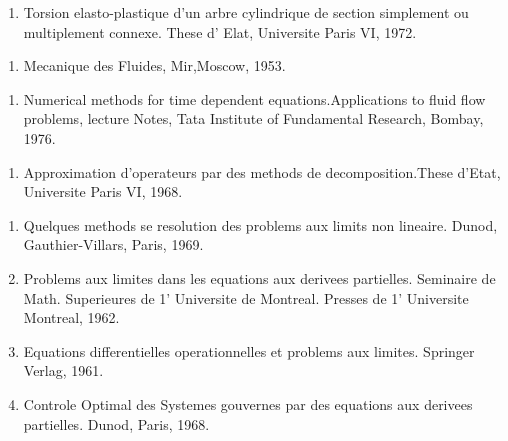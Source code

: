 \begin{thebibliography}{99}
  \begin{enumerate}
  \item Torsion elasto-plastique d'un arbre cylindrique de section
 simplement ou multiplement connexe. These d' Elat, Universite
 Paris VI, 1972.\label{k63:e1} 
  \end{enumerate}

  
  \begin{enumerate}
  \item  Mecanique des Fluides, Mir,Moscow, 1953.\label{k64:e1}
  \end{enumerate}
  
  
  \begin{enumerate}
  \item  Numerical methods for time dependent equations.Applications
 to fluid flow problems, lecture Notes, Tata Institute of
 Fundamental Research, Bombay, 1976.\label{k65:e1} 
  \end{enumerate}
  

  \begin{enumerate}
  \item Approximation d'operateurs par des methods de
 decomposition.These d'Etat, Universite Paris VI, 1968.\label{k66:e1} 
  \end{enumerate}
  
  
  \begin{enumerate}
  \item Quelques methods se resolution des problems aux limits non
 lineaire. Dunod, Gauthier-Villars, Paris, 1969.\label{k67:e1} 
  
  \item Problems aux limites dans les equations aux derivees
 partielles. Seminaire de Math. Superieures de 1' Universite de
 Montreal. Presses de 1' Universite Montreal, 1962.\label{k67:e2} 
 
  \item Equations differentielles operationnelles et problems aux
 limites. Springer Verlag, 1961.\label{k67:e3} 
 
  \item Controle Optimal des Systemes gouvernes par des equations aux
 derivees partielles. Dunod, Paris, 1968.\label{k67:e4} 
  \end{enumerate}


\end{thebibliography}
